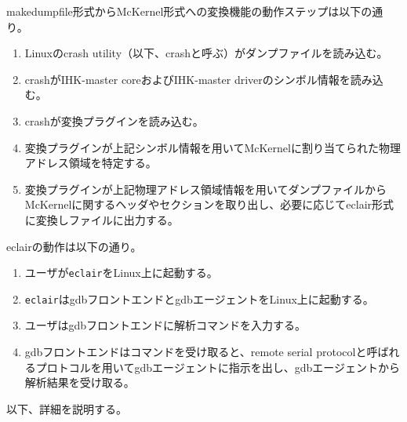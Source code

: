 \documentclass[twoside,11pt,fleqn]{book}
\begin{document}
{makedumpfile形式からMcKernel形式への変換機能の動作ステップは以下の通り。
\begin{enumerate}
\item Linuxのcrash utility（以下、crashと呼ぶ）がダンプファイルを読み込む。
\item crashがIHK-master coreおよびIHK-master driverのシンボル情報を読み込む。
\item crashが変換プラグインを読み込む。
\item 変換プラグインが上記シンボル情報を用いてMcKernelに割り当てられた物理アドレス領域を特定する。
\item 変換プラグインが上記物理アドレス領域情報を用いてダンプファイルからMcKernelに関するヘッダやセクションを取り出し、必要に応じてeclair形式に変換しファイルに出力する。
\end{enumerate}

eclairの動作は以下の通り。
\begin{enumerate}
\item ユーザが\texttt{eclair}をLinux上に起動する。
\item \texttt{eclair}はgdbフロントエンドとgdbエージェントをLinux上に起動する。
\item ユーザはgdbフロントエンドに解析コマンドを入力する。
\item gdbフロントエンドはコマンドを受け取ると、remote serial protocolと呼ばれるプロトコルを用いてgdbエージェントに指示を出し、gdbエージェントから解析結果を受け取る。
\end{enumerate}
}

以下、詳細を説明する。
\end{document}
